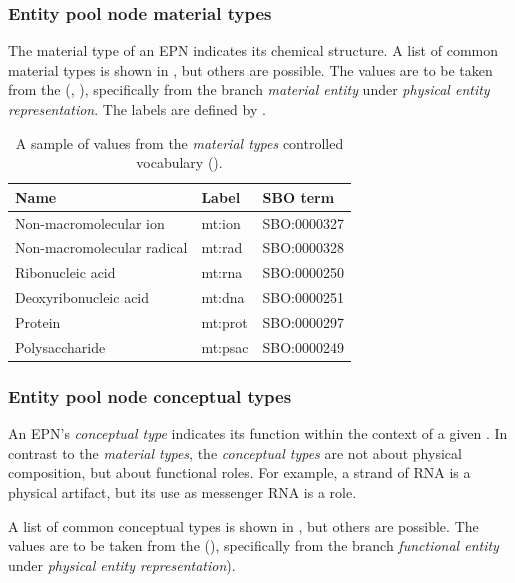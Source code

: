 \subsubsection{Entity pool node material types}
\label{sec:material-types-cv}

The material type of an EPN indicates its chemical structure.  A list of common material types is shown in , but others are possible.  The values are to be taken from the \sbo (\cite{Courtot:2011}, \sbourl), specifically from the branch \emph{material entity} under \emph{physical entity representation}.  The labels are defined by \SBGNPDLone.

\begin{table}[htb]
  \centering
  \begin{tabular}{l>{\ttfamily}l>{\ttfamily}l}
    \toprule
    \textbf{Name}              & \textbf{\rmfamily Label} & \textbf{\rmfamily SBO term} \\
    \midrule
    Non-macromolecular ion     & mt:ion  & SBO:0000327\\
    Non-macromolecular radical & mt:rad  & SBO:0000328\\
    Ribonucleic acid           & mt:rna  & SBO:0000250\\
    Deoxyribonucleic acid       & mt:dna  & SBO:0000251\\
    Protein                    & mt:prot & SBO:0000297\\
    Polysaccharide             & mt:psac & SBO:0000249\\
    \bottomrule
  \end{tabular}
  \caption{A sample of values from the \emph{material types} controlled
    vocabulary ().}
  \label{tab:material-types-cv}
\end{table}


\subsubsection{Entity pool node conceptual types}
\label{sec:conceptual-types-cv}

An EPN's \emph{conceptual type} indicates its function within the context of a given \PD.  
In contrast to the \emph{material types}, the \emph{conceptual types} are not about physical composition, but about functional roles.  For example, a strand of RNA is a physical artifact, but its use as messenger RNA is a role.

A list of common conceptual types is shown in , but others are possible.  The values are to be taken from the \sbo (\sbourl), specifically from the branch \emph{functional entity} under \emph{physical entity representation}). 

